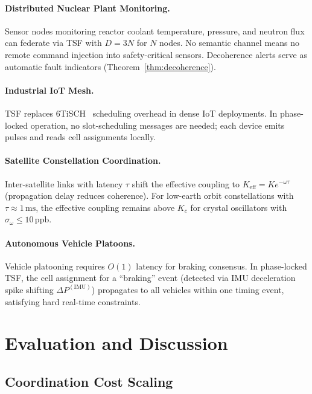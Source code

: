 \documentclass[twocolumn,10pt]{article}
\newcommand{\Kc}{K_c}
\newcommand{\DeltaP}{\Delta P}
\newcommand{\sigmaomega}{\sigma_{\omega}}
\begin{document}
\paragraph{Distributed Nuclear Plant Monitoring.}
Sensor nodes monitoring reactor coolant temperature, pressure, and neutron flux
can federate via TSF with $D = 3N$ for $N$ nodes. No semantic channel means
no remote command injection into safety-critical sensors. Decoherence alerts
serve as automatic fault indicators (Theorem~\ref{thm:decoherence}).

\paragraph{Industrial IoT Mesh.}
TSF replaces 6TiSCH~\cite{Watteyne2015} scheduling overhead in dense IoT
deployments. In phase-locked operation, no slot-scheduling messages are needed;
each device emits pulses and reads cell assignments locally.

\paragraph{Satellite Constellation Coordination.}
Inter-satellite links with latency $\tau$ shift the effective coupling to
$K_{\mathrm{eff}} = K e^{-\omega\tau}$ (propagation delay reduces coherence).
For low-earth orbit constellations with $\tau \approx 1\,\mathrm{ms}$, the
effective coupling remains above $\Kc$ for crystal oscillators with
$\sigmaomega \leq 10\,\mathrm{ppb}$.

\paragraph{Autonomous Vehicle Platoons.}
Vehicle platooning requires $O(1)$ latency for braking consensus. In
phase-locked TSF, the cell assignment for a ``braking'' event (detected via
IMU deceleration spike shifting $\DeltaP^{(\mathrm{IMU})}$) propagates to all
vehicles within one timing event, satisfying hard real-time constraints.

\section{Evaluation and Discussion}
\label{sec:evaluation}

\subsection{Coordination Cost Scaling}
\end{document}
